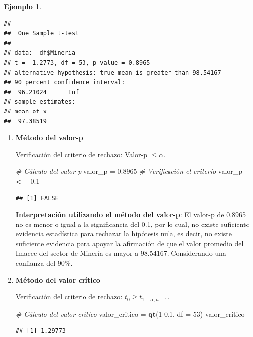 \documentclass[
  11pt,
]{book}
\newenvironment{Shaded}{\begin{snugshade}}{\end{snugshade}}
\newcommand{\AttributeTok}[1]{\textcolor[rgb]{0.13,0.29,0.53}{#1}}
\newcommand{\CommentTok}[1]{\textcolor[rgb]{0.56,0.35,0.01}{\textit{#1}}}
\newcommand{\DecValTok}[1]{\textcolor[rgb]{0.00,0.00,0.81}{#1}}
\newcommand{\FloatTok}[1]{\textcolor[rgb]{0.00,0.00,0.81}{#1}}
\newcommand{\FunctionTok}[1]{\textcolor[rgb]{0.13,0.29,0.53}{\textbf{#1}}}
\newcommand{\NormalTok}[1]{#1}
\newcommand{\OtherTok}[1]{\textcolor[rgb]{0.56,0.35,0.01}{#1}}
\newcommand{\SpecialCharTok}[1]{\textcolor[rgb]{0.81,0.36,0.00}{\textbf{#1}}}
\theoremstyle{definition}
\theoremstyle{definition}
\newtheorem{example}{Ejemplo}[chapter]
\theoremstyle{definition}
\theoremstyle{definition}
\theoremstyle{remark}
\begin{document}
\begin{example}
\begin{verbatim}
## 
##  One Sample t-test
## 
## data:  df$Mineria
## t = -1.2773, df = 53, p-value = 0.8965
## alternative hypothesis: true mean is greater than 98.54167
## 90 percent confidence interval:
##  96.21024      Inf
## sample estimates:
## mean of x 
##  97.38519
\end{verbatim}

\begin{enumerate}
\def\labelenumi{\arabic{enumi}.}
\item
  \textbf{Método del valor-p}

  Verificación del criterio de rechazo: Valor-p \(\leq \alpha\).

\begin{Shaded}
\begin{Highlighting}[]
\CommentTok{\# Cálculo del valor{-}p}
\NormalTok{valor\_p }\OtherTok{=} \FloatTok{0.8965}
\CommentTok{\# Verificación el criterio}
\NormalTok{valor\_p }\SpecialCharTok{\textless{}=} \FloatTok{0.1}
\end{Highlighting}
\end{Shaded}

\begin{verbatim}
## [1] FALSE
\end{verbatim}

  \textbf{Interpretación utilizando el método del valor-p}: El valor-p de 0.8965 no es menor o igual a la significancia del 0.1, por lo cual, no existe suficiente evidencia estadística para rechazar la hipótesis nula, es decir, no existe suficiente evidencia para apoyar la afirmación de que el valor promedio del Imacec del sector de Minería es mayor a 98.54167. Considerando una confianza del 90\%.
\item
  \textbf{Método del valor crítico}

  Verificación del criterio de rechazo: \(t_0 \geq t_{1-\alpha,n-1}\).

\begin{Shaded}
\begin{Highlighting}[]
\CommentTok{\# Cálculo del valor crítico}
\NormalTok{valor\_critico }\OtherTok{=} \FunctionTok{qt}\NormalTok{(}\DecValTok{1}\FloatTok{{-}0.1}\NormalTok{, }\AttributeTok{df =} \DecValTok{53}\NormalTok{)}
\NormalTok{valor\_critico}
\end{Highlighting}
\end{Shaded}

\begin{verbatim}
## [1] 1.29773
\end{verbatim}


\end{enumerate}
\end{example}
\end{document}
